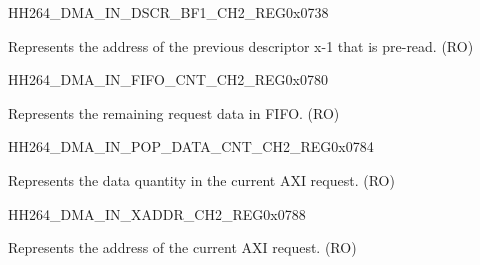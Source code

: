     
    \begin{register}{H}{H264\_DMA\_IN\_DSCR\_BF1\_CH2\_REG}{0x0738}\label{regdesc:H264DMAINDSCRBF1CH2REG}
    \regnewline%
    \begin{regdesc}\begin{reglist}
    \label{fielddesc:H264DMAINLINKDSCRBF1CH2}\item [H264\_DMA\_INLINK\_DSCR\_BF1\_CH2] Represents the address of the previous descriptor x-1 that is pre-read. (RO)
    \end{reglist}\end{regdesc}
    \end{register}
    
    \begin{register}{H}{H264\_DMA\_IN\_FIFO\_CNT\_CH2\_REG}{0x0780}\label{regdesc:H264DMAINFIFOCNTCH2REG}
    \regnewline%
    \begin{regdesc}\begin{reglist}
    \label{fielddesc:H264DMAINCMDFIFOINFIFOCNTCH2}\item [H264\_DMA\_IN\_CMDFIFO\_INFIFO\_CNT\_CH2] Represents the remaining request data in FIFO. (RO)
    \end{reglist}\end{regdesc}
    \end{register}
    
    
    \begin{register}{H}{H264\_DMA\_IN\_POP\_DATA\_CNT\_CH2\_REG}{0x0784}\label{regdesc:H264DMAINPOPDATACNTCH2REG}
    \regnewline%
    \begin{regdesc}\begin{reglist}
    \label{fielddesc:H264DMAINCMDFIFOPOPDATACNTCH2}\item [H264\_DMA\_IN\_CMDFIFO\_POP\_DATA\_CNT\_CH2] Represents the data quantity in the current AXI request. (RO)
    \end{reglist}\end{regdesc}
    \end{register}
    
    
    \begin{register}{H}{H264\_DMA\_IN\_XADDR\_CH2\_REG}{0x0788}\label{regdesc:H264DMAINXADDRCH2REG}
    \regnewline%
    \begin{regdesc}\begin{reglist}
    \label{fielddesc:H264DMAINCMDFIFOXADDRCH2}\item [H264\_DMA\_IN\_CMDFIFO\_XADDR\_CH2] Represents the address of the current AXI request. (RO)
    \end{reglist}\end{regdesc}
    \end{register}
    
